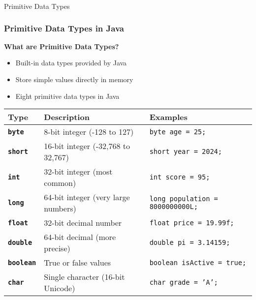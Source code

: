 \documentclass[aspectratio=169]{beamer}
\begin{document}
\begin{frame}{Primitive Data Types}
    \frametitle{Primitive Data Types in Java}
    
    \textbf{What are Primitive Data Types?}
    \begin{itemize}
        \item Built-in data types provided by Java
        \item Store simple values directly in memory
        \item Eight primitive data types in Java
    \end{itemize}
    
    \vspace{0.5em}
    
    \begin{table}[h]
        \centering
        \small
        \begin{tabular}{|l|l|l|}
            \hline
            \rowcolor{blue!30}
            \textbf{\color{white}Type} & \textbf{\color{white}Description} & \textbf{\color{white}Examples} \\
            \hline
            \texttt{\textbf{byte}} & 8-bit integer (-128 to 127) & \texttt{byte age = 25;} \\
            \hline
            \texttt{\textbf{short}} & 16-bit integer (-32,768 to 32,767) & \texttt{short year = 2024;} \\
            \hline
            \texttt{\textbf{int}} & 32-bit integer (most common) & \texttt{int score = 95;} \\
            \hline
            \texttt{\textbf{long}} & 64-bit integer (very large numbers) & \texttt{long population = 8000000000L;} \\
            \hline
            \texttt{\textbf{float}} & 32-bit decimal number & \texttt{float price = 19.99f;} \\
            \hline
            \texttt{\textbf{double}} & 64-bit decimal (more precise) & \texttt{double pi = 3.14159;} \\
            \hline
            \texttt{\textbf{boolean}} & True or false values & \texttt{boolean isActive = true;} \\
            \hline
            \texttt{\textbf{char}} & Single character (16-bit Unicode) & \texttt{char grade = 'A';} \\
            \hline
        \end{tabular}
    \end{table}
\end{frame}
\end{document}
